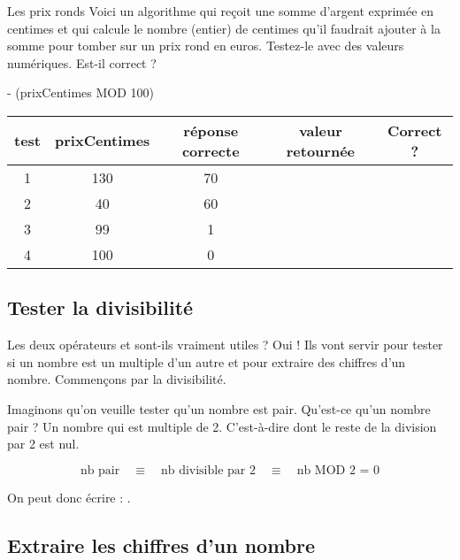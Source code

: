 			\begin{Exercice}{Les prix ronds}
				Voici un algorithme qui reçoit une somme d'argent exprimée en centimes
				et qui calcule le nombre (entier) de centimes qu'il
				faudrait ajouter à la somme pour tomber sur un prix rond en euros.
				Testez-le avec des valeurs numériques. Est-il correct ?
				
				\begin{LDA}
					 - (prixCentimes MOD 100)
				\EndAlgo
				\end{LDA}
				
				\begin{center}
				\begin{tabular}{|c|c|c|c|c|}
				\hline
				test \no & prixCentimes & réponse correcte & valeur retournée & Correct ? \\\hline
				\hline 
				1 & 130 & 70 &  & \\\hline
				2 & 40  & 60 &  & \\\hline
				3 & 99  & 1  &  & \\\hline
				4 & 100 & 0  &  & \\\hline
				\end{tabular}
				\end{center}
				
			\end{Exercice}
			
			
		\subsection{Tester la divisibilité}
		
			Les deux opérateurs  et 
			sont-ils vraiment utiles ?
			Oui ! Ils vont servir pour tester si un nombre
			est un multiple d'un autre et pour extraire
			des chiffres d'un nombre.
			Commençons par la divisibilité.

			Imaginons qu'on veuille tester qu'un nombre est pair.
			Qu'est-ce qu'un nombre pair ? Un nombre qui est multiple de 2.
			C'est-à-dire dont le reste de la division par 2 est nul.
			
			\[
			\textrm{nb pair} 
				\quad\equiv\quad \textrm{nb divisible par 2} 
				\quad\equiv\quad \textrm{nb MOD 2 = 0} 
			\]
			
			On peut donc écrire : .

		\subsection{Extraire les chiffres d'un nombre}
		
